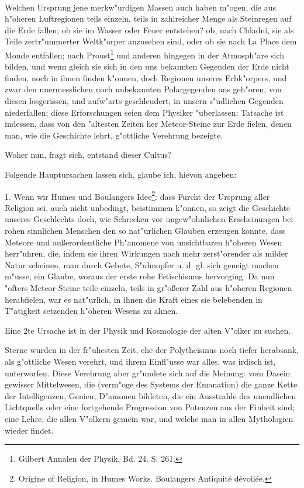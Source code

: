 \documentclass[a4paper, 11pt, oneside, polutonikogreek, german]{article}
\begin{document}
\paragraph{}
Welchen Ursprung jene merkw"urdigen Massen auch haben m"ogen, die aus h"oheren Luftregionen teils einzeln, teils in zahlreicher Menge als Steinregen auf die Erde fallen; ob sie im Wasser oder Feuer entstehen? ob, nach Chladni, sie als Teile zertr"ummerter Weltk"orper anzusehen sind, oder ob sie nach La Place dem Monde entfallen; nach Proust\footnote{Gilbert Annalen der Physik, Bd. 24. S. 261.} und anderen hingegen in der Atmosph"are sich bilden, und wenn gleich sie sich in den uns bekannten Gegenden der Erde nicht finden, noch in ihnen finden k"onnen, doch Regionen unseres Erbk"orpers, und zwar den unermesslichen noch unbekannten Polargegenden ans geh"oren, von diesen losgerissen, und aufw"arts geschleudert, in unsern s"udlichen Gegenden niederfallen; diese Erforschungen seien dem Physiker "uberlassen; Tatsache ist indessen, dass von den "altesten Zeiten her Meteor-Steine zur Erde fielen, denen man, wie die Geschichte lehrt, g"ottliche Verehrung bezeigte.

Woher nun, fragt sich, entstand dieser Cultus?

Folgende Hauptursachen lassen sich, glaube ich, hievon angeben:

1. Wenn wir Humes und Boulangers Idee\footnote{Origine of Religion, in Humes Works. Boulangers Antiquité dévoilée.}: dass Furcht der Ursprung aller Religion sei, auch nicht unbedingt, beistimmen k"onnen, so zeigt die Geschichte unseres Geschlechts doch, wie Schrecken vor ungew"ohnlichen Erscheinungen bei rohen sinnlichen Menschen den so nat"urlichen Glauben erzeugen konnte, dass Meteore und außerordentliche Ph"anomene von unsichtbaren h"oheren Wesen herr"uhren, die, indem sie ihren Wirkungen nach mehr zerst"orender als milder Natur scheinen, man durch Gebete, S"uhnopfer u. d. gl. sich geneigt machen m"usse, ein Glaube, woraus der erste rohe Fetischismus hervorging. Da nun "ofters Meteor-Steine teile einzeln, teils in gr"oßerer Zahl aus h"oheren Regionen herabfielen, war es nat"urlich, in ihnen die Kraft eines sie belebenden in T"atigkeit setzenden h"oheren Wesens zu ahnen.

Eine 2te Ursache ist in der Physik und Kosmologie der alten V"olker zu suchen.

Sterne wurden in der fr"uhesten Zeit, ehe der Polytheismus noch tiefer herabsank, als g"ottliche Wesen verehrt, und ihrem Einfl"usse war alles, was irdisch ist, unterworfen. Diese Verehrung aber gr"undete sich auf die Meinung: vom Dasein gewisser Mittelwesen, die (verm"oge des Systems der Emanation) die ganze Kette der Intelligenzen, Genien, D"amonen bildeten, die ein Ausstrahle des unendlichen Lichtquells oder eine fortgehende Progression von Potenzen aus der Einheit sind; eine Lehre, die allen V"olkern gemein war, und welche man in allen Mythologien wieder findet.
\end{document}
